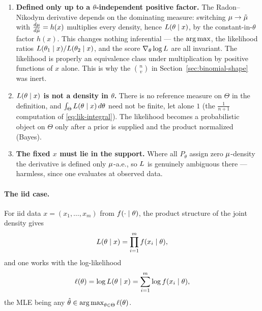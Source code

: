 \begin{enumerate}[label=\textbf{\arabic*.}, leftmargin=*, itemsep=0.4em]
  \item \textbf{Defined only up to a $\theta$-independent positive factor.}
    The Radon--Nikodym derivative depends on the dominating measure: switching
    $\mu \to \tilde{\mu}$ with $\frac{d \mu}{d \tilde{\mu}} = h(x)$ multiplies every
    density, hence $L(\theta \mid x)$, by the constant-in-$\theta$ factor
    $h(x)$. This changes nothing inferential --- the $\operatorname*{arg\,max}$, the likelihood
    ratios $L(\theta_1 \mid x)/L(\theta_2 \mid x)$, and the score
    $\nabla_\theta \log L$ are all invariant. The likelihood is properly an
    equivalence class under multiplication by positive functions of $x$ alone.
    This is why the $\binom{n}{v}$ in Section~\ref{sec:binomial-shape} was inert.

  \item \textbf{$L(\theta \mid x)$ is not a density in $\theta$.}
    There is no reference measure on $\Theta$ in the definition, and
    $\int_\Theta L(\theta \mid x)\, d\theta$ need not be finite, let alone
    $1$ (the $\tfrac{1}{n+1}$ computation of \eqref{eq:lik-integral}). The
    likelihood becomes a probabilistic object on $\Theta$ only after a prior is
    supplied and the product normalized (Bayes).

  \item \textbf{The fixed $x$ must lie in the support.}
    Where all $P_\theta$ assign zero $\mu$-density the derivative is defined
    only $\mu$-a.e., so $L$ is genuinely ambiguous there --- harmless,
    since one evaluates at observed data.
\end{enumerate}

\paragraph{The iid case.}
For iid data $x = (x_1, \dots, x_m)$ from $f(\cdot \mid \theta)$, the
product structure of the joint density gives
\begin{equation}
  L(\theta \mid x) = \prod_{i=1}^{m} f(x_i \mid \theta),
\end{equation}
and one works with the log-likelihood
\begin{equation}
  \ell(\theta) = \log L(\theta \mid x)
  = \sum_{i=1}^{m} \log f(x_i \mid \theta),
\end{equation}
the MLE being any $\hat\theta \in \operatorname*{arg\,max}_{\theta \in \Theta} \ell(\theta)$.
